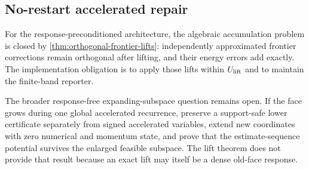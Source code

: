 \subsection{No-restart accelerated repair}

For the response-preconditioned architecture, the algebraic accumulation
problem is closed by \cref{thm:orthogonal-frontier-lifts}: independently
approximated frontier corrections remain orthogonal after lifting, and their
energy errors add exactly.  The implementation obligation is to apply those
lifts within $U_{\rm lift}$ and to maintain the finite-band reporter.

The broader response-free expanding-subspace question remains open.  If the
face grows during one global accelerated recurrence, preserve a support-safe
lower certificate separately from signed accelerated variables, extend new
coordinates with zero numerical and momentum state, and prove that the
estimate-sequence potential survives the enlarged feasible subspace.  The
lift theorem does not provide that result because an exact lift may itself be
a dense old-face response.
